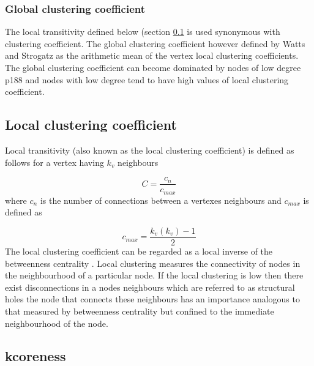 

\subsubsection{Global clustering coefficient}
\label{sec:Global clustering coefficient}
The local transitivity defined below (section \ref{sec:local clustering coefficient} is used synonymous with clustering coefficient. The global clustering coefficient however defined by Watts and Strogatz as the arithmetic mean of the vertex local clustering coefficients. The global clustering coefficient can become dominated by nodes of low degree \cite{newman2018networks} p188 and nodes with low degree tend to have high values of local clustering coefficient. 

\subsection{Local clustering coefficient}
\label{sec:local clustering coefficient}
Local transitivity (also known as the local clustering coefficient) is defined as  follows for a vertex having $k_v$ neighbours 

\begin{equation}
C = \frac{c_n}{c_{max}}
\end{equation}
\label{eq:local_transitvity}
where $c_n$ is the number of connections between a vertexes neighbours and $c_{max}$ is defined as 

\begin{equation}
c_{max} = \frac{k_v(k_v)-1}{2}
\end{equation}
\label{eq:local_transitivity_denominator}
The local clustering coefficient can be regarded as a local inverse of the betweenness centrality . Local clustering measures the connectivity of nodes in the neighbourhood of a particular node. If the local clustering is low then there exist disconnections in a nodes neighbours which are referred to as structural holes  the node that connects these neighbours has an importance analogous to that measured by betweenness centrality but confined to the immediate neighbourhood of the node.






\subsection{kcoreness}

